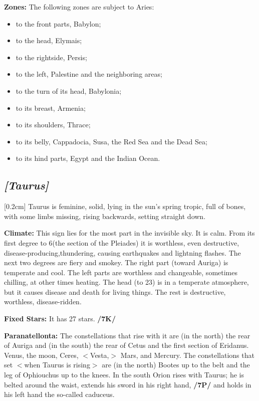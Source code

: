\textbf{Zones:} The following zones are subject to Aries: 
\begin{itemize}
\item to the front parts, Babylon; 
\item to the head, Elymais; 
\item to the rightside, Persis; 
\item to the left, Palestine and the neighboring areas; 
\item to the turn of its head, Babylonia; 
\item to its breast, Armenia; 
\item to its shoulders, Thrace; 
\item to its belly, Cappadocia, Susa, the Red Sea and the Dead Sea; 
\item to its hind parts, Egypt and the Indian Ocean.
\end{itemize}

\secbr
\subsection{\textit{[Taurus]}}
[0.2cm]
Taurus is feminine, solid, lying in the sun’s spring tropic, full of bones, with some limbs missing, rising backwards, setting straight down. 

\textbf{Climate:} This sign lies for the most part in the invisible sky. It is calm. From its first degree to 6\deg (the section of the Pleiades) it is worthless, even destructive, disease-producing,thundering, causing earthquakes and lightning flashes. The next two degrees are fiery and smokey. The right part (toward Auriga) is temperate and cool. The left parts are worthless and changeable, sometimes chilling, at other times heating. The head (to 23\deg) is in a temperate atmosphere, but it causes disease and death for living things. The rest is destructive, worthless, disease-ridden.

\textbf{Fixed Stars:} It has 27 stars. \textbf{/7K/}

\textbf{Paranatellonta:} The constellations that rise with it are (in the north) the rear of Auriga and (in the south) the rear of Cetus and the first section of Eridanus. Venus, the moon, Ceres, $<$Vesta,$>$ Mars, and Mercury. The constellations that set $<$when Taurus is rising$>$ are (in the north) Bootes up to the belt and the leg of Ophiouchus up to the knees. In the south Orion rises with Taurus; he is belted around the waist,
extends his sword in his right hand, \textbf{/7P/} and holds in his left hand the so-called caduceus.

